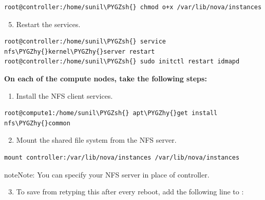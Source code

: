 \documentclass[letterpaper,10pt,english]{sphinxmanual}
\def\PYGZsh{\char`\#}
\def\PYGZhy{\char`\-}
\begin{document}
\begin{Verbatim}[commandchars=\\\{\}]
root@controller:/home/sunil\PYGZsh{} chmod o+x /var/lib/nova/instances
\end{Verbatim}
\begin{enumerate}
\setcounter{enumi}{4}
\item {} 
Restart the services.

\end{enumerate}

\begin{Verbatim}[commandchars=\\\{\}]
root@controller:/home/sunil\PYGZsh{} service nfs\PYGZhy{}kernel\PYGZhy{}server restart
root@controller:/home/sunil\PYGZsh{} sudo initctl restart idmapd
\end{Verbatim}

\textbf{On each of the compute nodes, take the following steps:}
\begin{enumerate}
\item {} 
Install the NFS client services.

\end{enumerate}

\begin{Verbatim}[commandchars=\\\{\}]
root@compute1:/home/sunil\PYGZsh{} apt\PYGZhy{}get install nfs\PYGZhy{}common
\end{Verbatim}
\begin{enumerate}
\setcounter{enumi}{1}
\item {} 
Mount the shared file system from the NFS server.

\end{enumerate}

\begin{Verbatim}[commandchars=\\\{\}]
mount controller:/var/lib/nova/instances /var/lib/nova/instances
\end{Verbatim}

\begin{notice}{note}{Note:}
You can specify your NFS server in place of controller.
\end{notice}
\begin{enumerate}
\setcounter{enumi}{2}
\item {} 
To save from retyping this after every reboot, add the following line to :

\end{enumerate}
\end{document}
